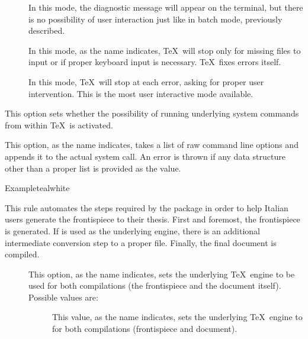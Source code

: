 \begin{description}
\begin{description}
\begin{description}
\item[] In this mode, the diagnostic message will appear on the terminal, but there is no possibility of user interaction just like in batch mode, previously described.

\item[] In this mode, as the name indicates, \TeX\ will stop only for missing files to input or if proper keyboard input is necessary. \TeX\ fixes errors itself.

\item[] In this mode, \TeX\ will stop at each error, asking for proper user intervention. This is the most user interactive mode available.
\end{description}

\item[\rpsbox{shell}] This option sets whether the possibility of running underlying system commands from within \TeX\ is activated.

\item[\abox{options}] This option, as the name indicates, takes a list of raw command line options and appends it to the actual system call. An error is thrown if any data structure other than a proper list is provided as the value.
\end{description}

\begin{codebox}{Example}{teal}{\icnote}{white}
\end{codebox}

\item[\rulebox{frontespizio}{Francesco Endrici, Enrico Gregorio, Paulo Cereda}] This rule automates the steps required by the  package in order to help Italian users generate the frontispiece to their thesis. First and foremost, the frontispiece is generated. If  is used as the underlying engine, there is an additional intermediate conversion step to a proper  file. Finally, the final document is compiled.

\begin{description}
\item[] This option, as the name indicates, sets the underlying \TeX\ engine to be used for both compilations (the frontispiece and the document itself). Possible values are:

\begin{description}
\item[] This value, as the name indicates, sets the underlying \TeX\ engine to  for both compilations (frontispiece and document).


\end{description}
\end{description}
\end{description}
